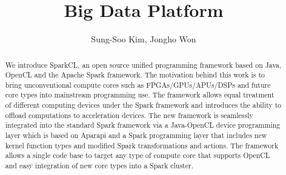 \documentclass[runningheads,a4paper]{llncs}
\begin{document}
\renewcommand\bibname{References}

\mainmatter  %

\title{Big Data Platform}


%
%
\author{
Sung-Soo Kim, Jongho Won
}

%


%
%

\maketitle


\begin{abstract}
We introduce SparkCL, an open source unified programming framework based on Java, OpenCL and the Apache Spark framework. The motivation behind this work is to bring unconventional compute cores such as FPGAs/GPUs/APUs/DSPs and future core types into mainstream programming use. The framework allows equal treatment of different computing devices under the Spark framework and introduces the ability to offload computations to acceleration devices. The new framework is seamlessly integrated into the standard Spark framework via a Java-OpenCL device programming layer which is based on Aparapi and a Spark programming layer that includes new kernel function types and modified Spark transformations and actions. The framework allows a single code base to target any type of compute core that supports OpenCL and easy integration of new core types into a Spark cluster.

\end{abstract}
\end{document}
